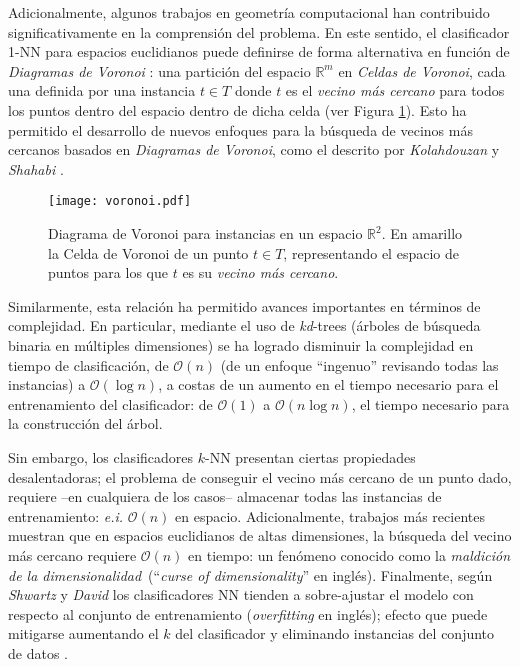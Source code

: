 Adicionalmente, algunos trabajos en geometría computacional han contribuido significativamente en la comprensión del problema. En este sentido, el clasificador 1-NN para espacios euclidianos puede definirse de forma alternativa en función de \emph{Diagramas de Voronoi} \cite{voronoi1908nouvelles}: una partición del espacio $\mathbb{R}^m$ en \emph{Celdas de Voronoi}, cada una definida por una instancia $t \in T$ donde $t$ es el \emph{vecino más cercano} para todos los puntos dentro del espacio dentro de dicha celda (ver Figura \ref{voronoi}). Esto ha permitido el desarrollo de nuevos enfoques para la búsqueda de vecinos más cercanos basados en \emph{Diagramas de Voronoi}, como el descrito por \emph{Kolahdouzan} y \emph{Shahabi} \cite{Kolahdouzan:2004:VKN:1316689.1316762}.

\begin{figure}[h!]
\centering
\texttt{[image: voronoi.pdf]}
\caption[Diagramas de Voronoi y NN]{Diagrama de Voronoi para instancias en un espacio $\mathbb{R}^2$. En amarillo la Celda de Voronoi de un punto $t \in T$, representando el espacio de puntos para los que $t$ es su \emph{vecino más cercano}.}
\label{voronoi}
\end{figure}

Similarmente, esta relación ha permitido avances importantes en términos de complejidad. En particular, mediante el uso de \emph{kd}-trees \cite{Bentley:1975:MBS:361002.361007} (árboles de búsqueda binaria en múltiples dimensiones) se ha logrado disminuir la complejidad en tiempo de clasificación, de $\mathcal{O}(n)$ (de un enfoque ``ingenuo'' revisando todas las instancias) a $\mathcal{O}(\log{n})$, a costas de un aumento en el tiempo necesario para el entrenamiento del clasificador: de $\mathcal{O}(1)$ a $\mathcal{O}(n\log{n})$, el tiempo necesario para la construcción del árbol.

Sin embargo, los clasificadores $k$-NN presentan ciertas propiedades desalentadoras; el problema de conseguir el vecino más cercano de un punto dado, requiere --en cualquiera de los casos-- almacenar todas las instancias de entrenamiento: \emph{e.i.} $\mathcal{O}(n)$ en espacio. Adicionalmente, trabajos más recientes \cite{DBLP:conf/soda/KrauthgamerL04} muestran que en espacios euclidianos de altas dimensiones, la búsqueda del vecino más cercano requiere $\mathcal{O}(n)$ en tiempo: un fenómeno conocido como la \guillemotleft\emph{maldición de la dimensionalidad}\guillemotright\ (``\emph{curse of dimensionality}'' en inglés). Finalmente, según \emph{Shwartz} y \emph{David} \cite{shalev2014understanding} los clasificadores NN tienden a sobre-ajustar el modelo con respecto al conjunto de entrenamiento (\emph{overfitting} en inglés); efecto que puede mitigarse aumentando el $k$ del clasificador \cite{devroye1994strong, shalev2014understanding} y eliminando instancias del conjunto de datos \cite{DBLP:journals/corr/GottliebKK13}.

